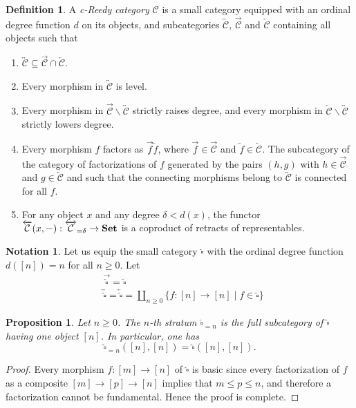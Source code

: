 \documentclass[a4paper,12pt]{amsart}
\newcommand{\C}{\mathcal{C}}
\renewcommand{\vec}{\overrightarrow}
\newtheorem{prop}[thm]{Proposition}
\newcommand{\bp}{\begin{prop}}
\newcommand{\ep}{\end{prop}}
\newcommand{\bpf}{\begin{proof}}
\newcommand{\epf}{\end{proof}}
\theoremstyle{definition}
\newtheorem{defn}[thm]{Definition}
\newcommand{\bd}{\begin{defn}}
\newcommand{\ed}{\end{defn}}
\newtheorem{nota}[thm]{Notation}
\renewcommand{\leq}{\leqslant}
\renewcommand{\geq}{\geqslant}
\newcommand{\brm}[1]{{\rm{\mathbf{#1}}}}
\newcommand{\set}{{\brm{Set}}}
\begin{document}
\bd \cite[Definition~8.25]{c-Reedy} 
A \textit{c-Reedy category} $\C$ is a small category equipped with an ordinal degree function $d$ on its objects, and subcategories $\overleftrightarrow{\C}$, $\overrightarrow{\C}$ and $\overleftarrow{\C}$ containing all objects such that 
\begin{enumerate}
	\item $\overleftrightarrow{\C}\subseteq \overrightarrow{\C} \cap\overleftarrow{\C}$.
	\item Every morphism in $\overleftrightarrow{\C}$ is level.
	\item Every morphism in $\overrightarrow{\C}\backslash \overleftrightarrow{\C}$ strictly raises degree, and every morphism in $\overleftarrow{\C}\backslash \overleftrightarrow{\C}$ strictly lowers degree.
	\item Every morphism $f$ factors as $\overrightarrow{f}\overleftarrow{f}$, where $\overrightarrow{f}\in \overrightarrow{\C}$ and $\overleftarrow{f}\in \overleftarrow{\C}$. The subcategory of the category of factorizations of $f$ generated by the pairs $(h,g)$ with $h\in\overrightarrow{\C}$ and $g\in \overleftarrow{\C}$ and such that the connecting morphisms belong to $\overleftrightarrow{\C}$ is connected for all $f$. 
	\item For any object $x$ and any degree $\delta<d(x)$, the functor $\overleftarrow{\C}(x,-):\overleftrightarrow{\C}_{=\delta} \to \set$ is a coproduct of retracts of representables.
\end{enumerate}
\ed


\begin{nota}
Let us equip the small category $\widehat{\square}$ with the ordinal degree function $d([n])=n$ for all $n\geq 0$. Let 
	\begin{align*}
		& \vec{\widehat{\square}}=\widehat{\square}\\
		& \overleftrightarrow{\widehat{\square}}=\overleftarrow{\widehat{\square}}= \coprod_{n\geq 0}\{f:[n]\to [n]\mid f\in \widehat{\square}\}
	\end{align*}
\end{nota}

\bp \label{equal}
Let $n\geq 0$. The $n$-th stratum $\widehat{\square}_{=n}$ is the full subcategory of $\widehat{\square}$ having one object $[n]$. In particular, one has \[\widehat{\square}_{=n}([n],[n])=\widehat{\square}([n],[n]).\]
\ep

\bpf
Every morphism $f:[m]\to [n]$ of $\widehat{\square}$ is basic since every factorization of $f$ as a composite $[m]\to [p]\to [n]$ implies that $m\leq p\leq n$, and therefore a factorization cannot be fundamental. Hence the proof is complete.
\epf
\end{document}
